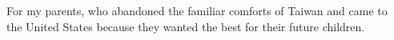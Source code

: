 \begin{center}%
\vspace{-20 mm}
For my parents, who abandoned the familiar comforts of Taiwan and came to\\
the United States because they wanted the best for their future children.\\
\end{center}
